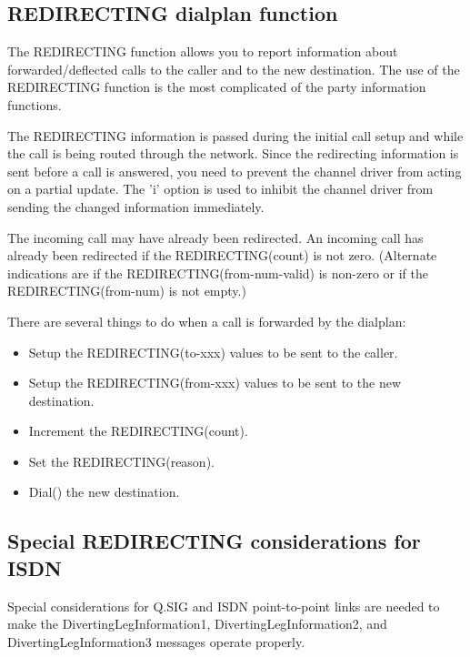 \subsection{REDIRECTING dialplan function}

The REDIRECTING function allows you to report information about
forwarded/deflected calls to the caller and to the new destination.  The
use of the REDIRECTING function is the most complicated of the party
information functions.

The REDIRECTING information is passed during the initial call setup and
while the call is being routed through the network.  Since the redirecting
information is sent before a call is answered, you need to prevent the
channel driver from acting on a partial update.  The 'i' option is used to
inhibit the channel driver from sending the changed information
immediately.

The incoming call may have already been redirected.  An incoming call has
already been redirected if the REDIRECTING(count) is not zero.  (Alternate
indications are if the REDIRECTING(from-num-valid) is non-zero or if the
REDIRECTING(from-num) is not empty.)

There are several things to do when a call is forwarded by the dialplan:

\begin{itemize}

\item Setup the REDIRECTING(to-xxx) values to be sent to the caller.

\item Setup the REDIRECTING(from-xxx) values to be sent to the new
destination.

\item Increment the REDIRECTING(count).

\item Set the REDIRECTING(reason).

\item Dial() the new destination.

\end{itemize}

\subsection{Special REDIRECTING considerations for ISDN}

Special considerations for Q.SIG and ISDN point-to-point links are needed
to make the DivertingLegInformation1, DivertingLegInformation2, and
DivertingLegInformation3 messages operate properly.

